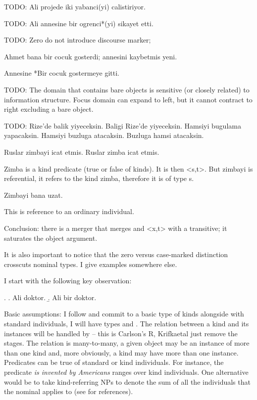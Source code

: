 \documentclass[11pt,a4paper]{article}
\begin{document}
TODO: Ali projede iki yabanci(yi) calistiriyor.

TODO: Ali annesine bir ogrenci*(yi) sikayet etti.

TODO: Zero do not introduce discourse marker;

Ahmet bana bir cocuk gosterdi; annesini kaybetmis yeni. 

Annesine *Bir cocuk gostermeye gitti.

TODO: The domain that contains bare objects is sensitive (or closely related) to information structure. Focus domain can expand to left, but it cannot contract to right excluding a bare object.

TODO: 
Rize'de balik yiyeceksin.
Baligi Rize'de yiyeceksin. 
Hamsiyi bugulama yapacaksin.
Hamsiyi buzluga atacaksin. 
Buzluga hamsi atacaksin.

Ruslar zimbayi icat etmis.
Ruslar zimba icat etmis.

Zimba is a kind predicate (true or false of kinds). It is then <s,t>. But zimbayi is referential, it refers to the kind zimba, therefore it is of type s.

Zimbayi bana uzat.

This is reference to an ordinary individual.

Conclusion: there is a merger that merges and <x,t> with a transitive; it saturates the object argument.


It is also important to notice that the zero versus case-marked distinction crosscuts nominal types. I give examples somewhere else.

I start with the following key observation:

\ex.\label{ex:doktor} 
\a. Ali doktor.
\b. Ali bir doktor.

Basic assumptions: I follow \cite[p.\ 64]{krifkaetal95} and commit to a basic type of kinds alongside with standard individuals, I will have types  and . The relation between a kind and its instances will be handled by  -- this is Carlson's R, Krifkaetal just remove the stages. The relation is many-to-many, a given object may be an instance of more than one kind and, more obviously, a kind may have more than one instance. Predicates can be true of standard or kind individuals. For instance, the predicate \textit{is invented by Americans} ranges over kind individuals. One alternative would be to take kind-referring NPs to denote the sum of all the individuals that the nominal applies to (see \cite{krifkaetal95} for references).
\end{document}
